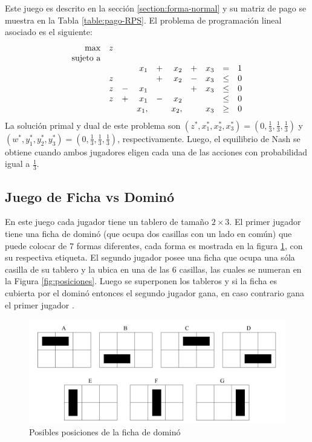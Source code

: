 Este juego es descrito en la sección \ref{section:forma-normal} y su matriz de pago se muestra en la Tabla \ref{table:pago-RPS}. El problema de programación lineal asociado es el siguiente:
\begin{equation}
\begin{array}{r r r r r r r r r r}
\max  & z &  & & & & &\\
\text{sujeto a} \\  
&   &   & x_1  & + & x_2  & + & x_3 & =    & 1 \\
& z &   &      & + & x_2  & - & x_3 & \leq & 0 \\
& z & - & x_1  &   &      & + & x_3 & \leq & 0 \\
& z & + & x_1  & - & x_2  &   &     & \leq & 0 \\
&   &   & x_1, &   & x_2, &   & x_3 & \geq & 0
\end{array}
\end{equation}
La solución primal y dual de este problema son $(z^*, x_1^*, x_2^*, x_3^*) = (0, \frac{1}{3}, \frac{1}{3}, \frac{1}{3})$ y $(w^*, y_1^*, y_2^*, y_3^*) = (0, \frac{1}{3}, \frac{1}{3}, \frac{1}{3})$, respectivamente. Luego, el equilibrio de Nash se obtiene cuando ambos jugadores eligen cada una de las acciones con probabilidad igual a $\frac{1}{3}$.

\subsection*{Juego de Ficha vs Dominó}

En este juego cada jugador tiene un tablero de tamaño $2\times 3$. El primer jugador tiene una ficha de dominó (que ocupa dos casillas con un lado en común) que puede colocar de $7$ formas diferentes, cada forma es mostrada en la figura \ref{fig:posiciones-domino}, con su respectiva etiqueta. El segundo jugador posee una ficha que ocupa una sóla casilla de su tablero y la ubica en una de las $6$ casillas, las cuales se numeran en la Figura \ref{fig:posiciones}. Luego se superponen los tableros y si la ficha es cubierta por el dominó entonces el segundo jugador gana, en caso contrario gana el primer jugador \cite[p. 237]{bib:pl-chvatal}.

\begin{figure}[hbt]
\caption{Posibles posiciones de la ficha de dominó}
\label{fig:posiciones-domino}
\centering
\includegraphics[width=1\textwidth]{figuras/posiciones-domino.png}
\end{figure}

